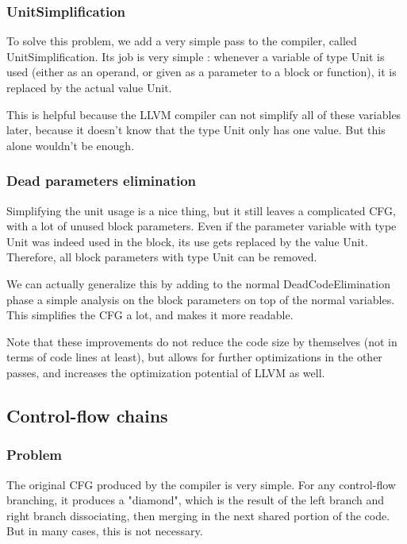\documentclass[12pt,a4paper]{article}
\newcommand{\scala}[1]{\textsf{#1}}
\begin{document}
\subsubsection*{UnitSimplification}

To solve this problem, we add a very simple pass to the compiler, called \scala{UnitSimplification}. Its job is very simple : whenever a variable of type \scala{Unit} is used (either as an operand, or given as a parameter to a block or function), it is replaced by the actual value \scala{Unit}.

This is helpful because the LLVM compiler can not simplify all of these variables later, because it doesn't know that the type \scala{Unit} only has one value. But this alone wouldn't be enough.

\subsubsection*{Dead parameters elimination}

Simplifying the unit usage is a nice thing, but it still leaves a complicated CFG, with a lot of unused block parameters. Even if the parameter variable with type \scala{Unit} was indeed used in the block, its use gets replaced by the value \scala{Unit}. Therefore, all block parameters with type \scala{Unit} can be removed.

We can actually generalize this by adding to the normal \scala{DeadCodeElimination} phase a simple analysis on the block parameters on top of the normal variables. This simplifies the CFG a lot, and makes it more readable.

Note that these improvements do not reduce the code size by themselves (not in terms of code lines at least), but allows for further optimizations in the other passes, and increases the optimization potential of LLVM as well.

\subsection{Control-flow chains}

\subsubsection*{Problem}

The original CFG produced by the compiler is very simple. For any control-flow branching, it produces a "diamond", which is the result of the left branch and right branch dissociating, then merging in the next shared portion of the code. But in many cases, this is not necessary.
\end{document}
